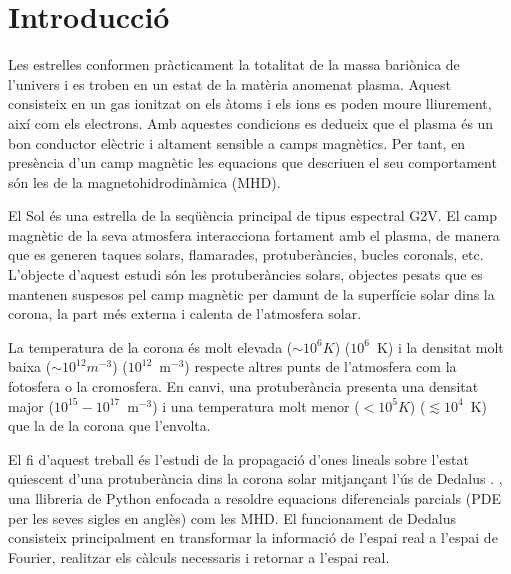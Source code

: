 
\chapter{Introducció} \label{sec:intro}


Les estrelles conformen pràcticament la totalitat de la massa bariònica de l'univers i es troben en un estat de la matèria anomenat plasma.
Aquest consisteix en un gas ionitzat on els àtoms i els ions es poden moure lliurement, així com els electrons.
Amb aquestes condicions es dedueix que el plasma és un bon conductor elèctric i altament sensible a camps magnètics.
Per tant, en presència d'un camp magnètic les equacions que descriuen el seu comportament són les de la magnetohidrodinàmica (MHD).

El Sol és una estrella de la seqüència principal de tipus espectral G2V.
El camp magnètic de la seva atmosfera interacciona fortament amb el plasma, de manera que es generen taques solars, flamarades, protuberàncies, bucles coronals, etc.
L'objecte d'aquest estudi són les protuberàncies solars,
objectes pesats que es mantenen suspesos pel camp magnètic per damunt de la superfície solar dins la corona,
la part més externa i calenta de l'atmosfera solar.

La temperatura de la corona és molt elevada ($\sim 10^6 K$) ($10^6$~K) i la densitat molt baixa ($\sim 10^{12} m^{-3}$) ($10^12$~m$^{-3}$) respecte altres punts de l'atmosfera com la fotosfera o la cromosfera.
En canvi, una protuberància presenta una densitat major ($10^{15}-10^{17}$~m$^{-3}$) i una temperatura molt menor ($< 10^5 K$) ($\lesssim10^4$~K) que la de la corona que l'envolta.


El fi d'aquest treball és l'estudi de la propagació d'ones lineals sobre l'estat quiescent d'una protuberància dins la corona solar mitjançant l'ús de Dedalus \parencite{Dedalus}.
, una llibreria de Python enfocada a resoldre equacions diferencials parcials (PDE per les seves sigles en anglès) com les MHD.
El funcionament de Dedalus consisteix principalment en transformar la informació de l'espai real a l'espai de Fourier,
realitzar els càlculs necessaris i retornar a l'espai real.

